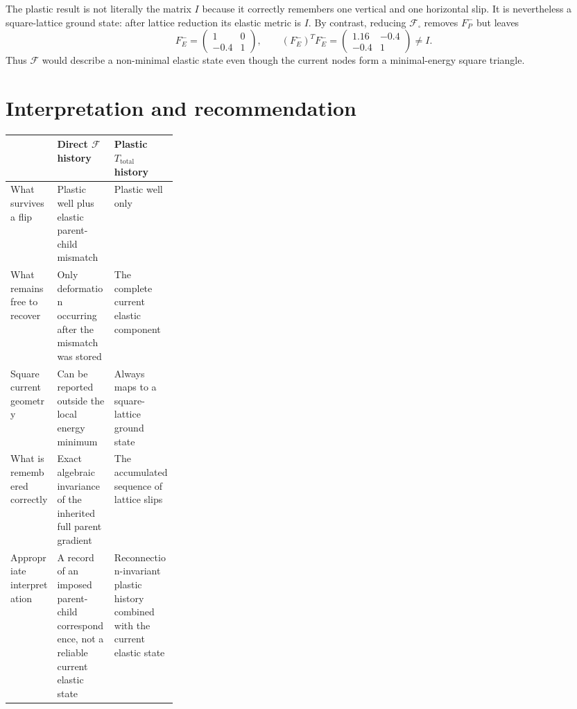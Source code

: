 \documentclass[9pt,a4paper]{extarticle}
\newcommand{\Em}{F_E^-}
\newcommand{\Pm}{F_P^-}
\newcommand{\Ttot}{T_{\mathrm{total}}}
\begin{document}
The plastic result is not literally the matrix $I$ because it correctly
remembers one vertical and one horizontal slip.  It is nevertheless a
square-lattice ground state: after lattice reduction its elastic metric is
$I$.  By contrast, reducing $\mathcal F_{\square}$ removes $\Pm$ but leaves
\begin{equation}
\Em=\begin{pmatrix}1&0\\-0.4&1\end{pmatrix},
\qquad
(\Em)^T\Em=
\begin{pmatrix}1.16&-0.4\\-0.4&1\end{pmatrix}\ne I.
\label{eq:residual}
\end{equation}
Thus $\mathcal F$ would describe a non-minimal elastic state even though the
current nodes form a minimal-energy square triangle.

\section{Interpretation and recommendation}

\begin{center}
\renewcommand{\arraystretch}{1.17}
\begin{tabularx}{0.96\linewidth}{@{}>{\raggedright\arraybackslash}p{0.28\linewidth}
  >{\raggedright\arraybackslash}X >{\raggedright\arraybackslash}X@{}}
\toprule
 & \textbf{Direct $\mathcal F$ history} & \textbf{Plastic $\Ttot$ history}\\
\midrule
What survives a flip
  & Plastic well plus elastic parent-child mismatch
  & Plastic well only\\
What remains free to recover
  & Only deformation occurring after the mismatch was stored
  & The complete current elastic component\\
Square current geometry
  & Can be reported outside the local energy minimum
  & Always maps to a square-lattice ground state\\
What is remembered correctly
  & Exact algebraic invariance of the inherited full parent gradient
  & The accumulated sequence of lattice slips\\
Appropriate interpretation
  & A record of an imposed parent-child correspondence, not a reliable current elastic state
  & Reconnection-invariant plastic history combined with the current elastic state\\
\bottomrule
\end{tabularx}
\end{center}
\end{document}

